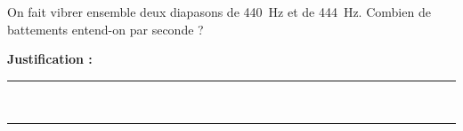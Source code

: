 On fait vibrer ensemble deux diapasons de \qty{440}{Hz} et de \qty{444}{Hz}. Combien de battements entend-on par seconde ?

\choices

\noindent\textbf{Justification :} \hrulefill \\[2.5ex]
\rule{\linewidth}{0.4pt} \\[2.5ex]
\rule{\linewidth}{0.4pt}
\vfill
